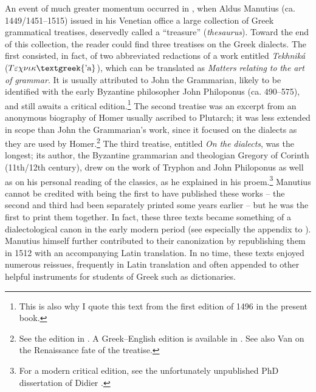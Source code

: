 \documentclass[output=paper]{langsci/langscibook}
\begin{document}
An event of much greater momentum occurred in \citealt{August1496}, when Aldus Manutius (ca. 1449/1451–1515) issued in his Venetian office a large collection of Greek grammatical treatises, deservedly called a “treasure” (\textit{thesaurus}). Toward the end of this collection, the reader could find three treatises on the Greek dialects. The first consisted, in fact, of two abbreviated redactions of a work entitled \textit{Tekhniká} ($T\varepsilon \chi \nu \iota \kappa \text{\textgreek{'a}}$), which can be translated as \textit{Matters} \textit{relating} \textit{to} \textit{the} \textit{art} \textit{of} \textit{grammar}. It is usually attributed to John the Grammarian, likely to be identified with the early Byzantine philosopher John Philoponus (ca. 490–575), and still awaits a critical edition.\footnote{This is also why I quote this text from the first edition of 1496 in the present book.} The second treatise was an excerpt from an anonymous biography of Homer usually ascribed to Plutarch; it was less extended in scope than John the Grammarian’s work, since it focused on the dialects as they are used by Homer.\footnote{See the edition in \citet{Kindstrand1990}. A Greek–English edition is available in \citet{KeaneyLamberton1996}. See also Van \citet{Rooy2018c} on the Renaissance fate of the treatise.} The third treatise, entitled \textit{On} \textit{the} \textit{dialects}, was the longest; its author, the Byzantine grammarian and theologian Gregory of Corinth (11th/12th century), drew on the work of Tryphon and John Philoponus as well as on his personal reading of the classics, as he explained in his proem.\footnote{For a modern critical edition, see the unfortunately unpublished PhD dissertation of Didier \citet{Xhardez1991}.} Manutius cannot be credited with being the first to have published these works – the second and third had been separately printed some years earlier – but he was the first to print them together. In fact, these three texts became something of a dialectological canon in the early modern period (see especially the appendix to \citealt{Trovato1984}). Manutius himself further contributed to their canonization by republishing them in 1512 with an accompanying Latin translation. In no time, these texts enjoyed numerous reissues, frequently in Latin translation and often appended to other helpful instruments for students of Greek such as dictionaries.
\end{document}
